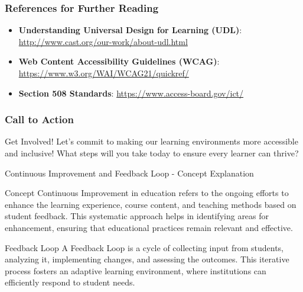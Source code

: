 \documentclass[aspectratio=169]{beamer}
\begin{document}
\begin{frame}[fragile]
    \frametitle{References for Further Reading}
    \begin{itemize}
        \item \textbf{Understanding Universal Design for Learning (UDL)}: \url{http://www.cast.org/our-work/about-udl.html}
        \item \textbf{Web Content Accessibility Guidelines (WCAG)}: \url{https://www.w3.org/WAI/WCAG21/quickref/}
        \item \textbf{Section 508 Standards}: \url{https://www.access-board.gov/ict/}
    \end{itemize}
\end{frame}

\begin{frame}[fragile]
    \frametitle{Call to Action}
    \begin{block}{Get Involved!}
        Let’s commit to making our learning environments more accessible and inclusive! What steps will you take today to ensure every learner can thrive?
    \end{block}
\end{frame}

\begin{frame}[fragile]{Continuous Improvement and Feedback Loop - Concept Explanation}
    \begin{block}{Concept}
        Continuous Improvement in education refers to the ongoing efforts to enhance the learning experience, course content, and teaching methods based on student feedback. This systematic approach helps in identifying areas for enhancement, ensuring that educational practices remain relevant and effective.
    \end{block}
    \begin{block}{Feedback Loop}
        A Feedback Loop is a cycle of collecting input from students, analyzing it, implementing changes, and assessing the outcomes. This iterative process fosters an adaptive learning environment, where institutions can efficiently respond to student needs.
    \end{block}
\end{frame}
\end{document}

